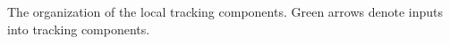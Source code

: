 \label{fig:locTracFlow} The organization of the local tracking components. Green arrows denote inputs into tracking components.